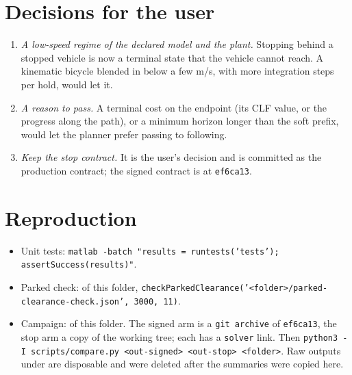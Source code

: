 \documentclass[11pt]{article}
\begin{document}
\section{Decisions for the user}
\begin{enumerate}
\item \emph{A low-speed regime of the declared model and the plant.} Stopping
behind a stopped vehicle is now a terminal state that the vehicle cannot
reach. A kinematic bicycle blended in below a few m/s, with more integration
steps per hold, would let it.
\item \emph{A reason to pass.} A terminal cost on the endpoint (its CLF
value, or the progress along the path), or a minimum horizon longer than
the soft prefix, would let the planner prefer passing to following.
\item \emph{Keep the stop contract.} It is the user's decision and is
committed as the production contract; the signed contract is at
\texttt{ef6ca13}.
\end{enumerate}

\section{Reproduction}
\begin{itemize}
\item Unit tests: \texttt{matlab -batch "results = runtests('tests'); assertSuccess(results)"}.
\item Parked check:  of this folder,
  \texttt{checkParkedClearance('<folder>/parked-clearance-check.json', 3000, 11)}.
\item Campaign:  of this folder. The signed
  arm is a \texttt{git archive} of \texttt{ef6ca13}, the stop arm a copy of
  the working tree; each has a \texttt{solver} link. Then
  \texttt{python3 -I scripts/compare.py <out-signed> <out-stop> <folder>}.
  Raw outputs under 
  are disposable and were deleted after the summaries were copied here.
\end{itemize}
\end{document}
